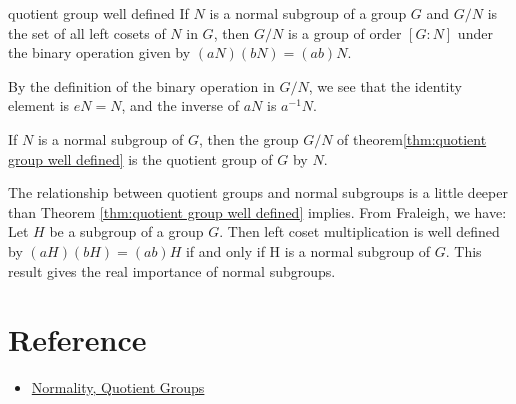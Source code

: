\begin{theorem}{}{quotient group well defined}
    If $N$ is a normal subgroup of a group $G$ and $G/N$ is the set of 
    all left cosets of $N$ in $G$, 
    then $G/N$ is a group of order $[G:N]$ 
    under the binary operation given by $(aN)(bN)=(ab)N$.
\end{theorem}

\begin{remark}{}{}
    By the definition of the binary operation in $G/N$,
    we see that the identity element is $eN=N$,
    and the inverse of $aN$ is $a^{-1}N$.
\end{remark}

\begin{definition}{}{}
    If $N$ is a normal subgroup of $G$, then the group $G/N$
    of theorem\ref{thm:quotient group well defined}
    is the quotient group of $G$ by $N$.
\end{definition}
\begin{remark}
    The relationship between quotient groups 
    and normal subgroups is a little
    deeper than Theorem \ref{thm:quotient group well defined} 
    implies. From Fraleigh, we have:
    Let $H$ be a subgroup of a group $G$. 
    Then left coset multiplication is well defined by 
    $(aH)(bH) = (ab)H$ 
    if and only if H is a normal subgroup of $G$.
    This result gives the real importance of normal subgroups.
\end{remark}

\section{Reference}

\begin{itemize}
    \item \href{https://faculty.etsu.edu/gardnerr/5410/notes/I-5.pdf}{Normality, Quotient Groups}
\end{itemize}
